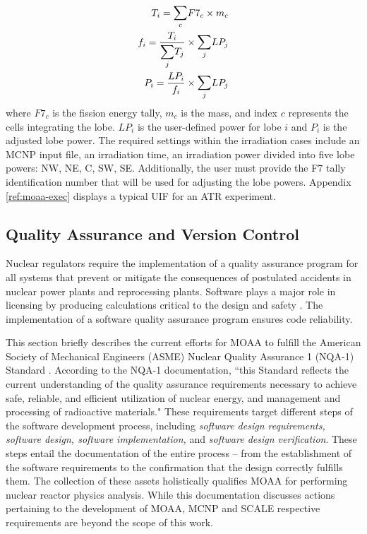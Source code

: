 \begin{align}
T_i = \mathlarger{\sum}_c F7_{c} \times m_c \\
f_i = \frac{T_i}{ \mathlarger{\sum}_j T_j } \times \mathlarger{\sum}_j LP_j \\
P_i = \frac{LP_i}{f_i} \times \mathlarger{\sum}_j LP_j
\end{align}
where $F7_{c}$ is the fission energy tally, $m_c$ is the mass, and index $c$ represents the cells integrating the lobe.
$LP_i$ is the user-defined power for lobe $i$ and $P_i$ is the adjusted lobe power.
The required settings within the irradiation cases include an MCNP input file, an irradiation time, an irradiation power divided into five lobe powers: NW, NE, C, SW, SE.
Additionally, the user must provide the F7 tally identification number that will be used for adjusting the lobe powers.
Appendix \ref{ref:moaa-exec} displays a typical UIF for an ATR experiment.


\subsection{Quality Assurance and Version Control}
\label{sec:quality}

Nuclear regulators require the implementation of a quality assurance program for all systems that prevent or mitigate the consequences of postulated accidents in nuclear power plants and reprocessing plants.
Software plays a major role in licensing by producing calculations critical to the design and safety \cite{sqa}.
The implementation of a software quality assurance program ensures code reliability.

This section briefly describes the current efforts for MOAA to fulfill the American Society of Mechanical Engineers (ASME) Nuclear Quality Assurance 1 (NQA-1) Standard \cite{nqa1}.
According to the NQA-1 documentation, ``this Standard reflects the current understanding of the quality assurance requirements necessary to achieve safe, reliable, and efficient utilization of nuclear energy, and management and processing of radioactive materials."
These requirements target different steps of the software development process, including \textit{software design requirements, software design, software implementation,} and \textit{software design verification}.
These steps entail the documentation of the entire process -- from the establishment of the software requirements to the confirmation that the design correctly fulfills them.
% 
The collection of these assets holistically qualifies MOAA for performing nuclear reactor physics analysis.
While this documentation discusses actions pertaining to the development of MOAA, MCNP and SCALE respective requirements are beyond the scope of this work.

